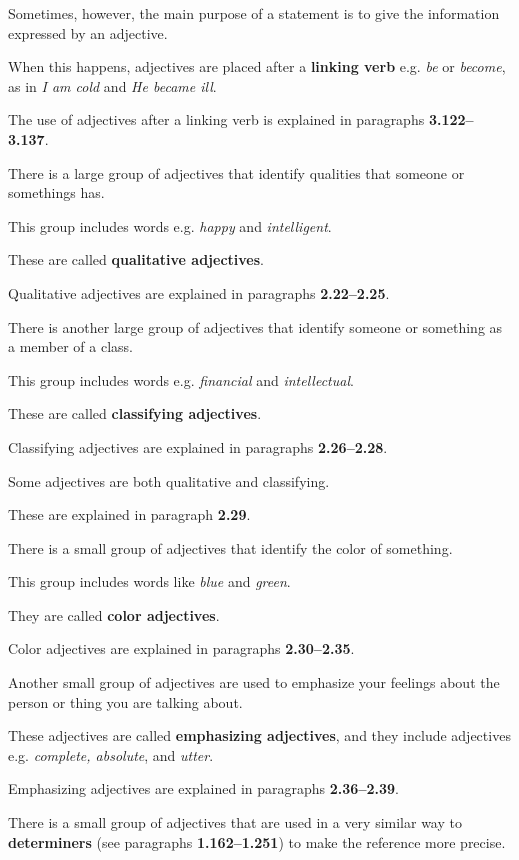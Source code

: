 \documentclass[oneside]{book}
\numberwithin{equation}{section}
\begin{document}
%
\noindent{} Sometimes, however, the main purpose of a statement is to give the information expressed by an adjective.

When this happens, adjectives are placed after a \textbf{linking verb} e.g. \textit{be} or \textit{become}, as in \textit{I am cold} and \textit{He became ill}.

The use of adjectives after a linking verb is explained in paragraphs \textbf{3.122--3.137}.

%
\noindent{} There is a large group of adjectives that identify qualities that someone or somethings has.

This group includes words e.g. \textit{happy} and \textit{intelligent}.

These are called \textbf{qualitative adjectives}.

%
Qualitative adjectives are explained in paragraphs \textbf{2.22--2.25}.

%
\noindent{} There is another large group of adjectives that identify someone or something as a member of a class.

This group includes words e.g. \textit{financial} and \textit{intellectual}.

These are called \textbf{classifying adjectives}.

%
Classifying adjectives are explained in paragraphs \textbf{2.26--2.28}.

%
Some adjectives are both qualitative and classifying.

These are explained in paragraph \textbf{2.29}.

%
\noindent{} There is a small group of adjectives that identify the color of something.

This group includes words like \textit{blue} and \textit{green}.

They are called \textbf{color adjectives}.

%
Color adjectives are explained in paragraphs \textbf{2.30--2.35}.

%
\noindent{} Another small group of adjectives are used to emphasize your feelings about the person or thing you are talking about.

These adjectives are called \textbf{emphasizing adjectives}, and they include adjectives e.g. \textit{complete, absolute}, and \textit{utter}.

%
Emphasizing adjectives are explained in paragraphs \textbf{2.36--2.39}.

%
\noindent{} There is a small group of adjectives that are used in a very similar way to \textbf{determiners} (see paragraphs \textbf{1.162--1.251}) to make the reference more precise.
\end{document}
